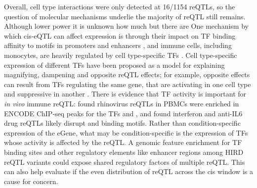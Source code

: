 Overall, cell type interactions were only detected at 16/1154 reQTLs,
so the question of molecular mechanisms underlie the majority of reQTL still remains.
Although lower power  it is unknown how much
but there are 
One mechanism by which cis-eQTL can affect expression is through their impact on \gls{TF} binding affinity to motifs in promoters and enhancers \autocite{pai2015GeneticMechanisticBasis}, 
and immune cells, including monocytes, are heavily regulated by cell type-specific \glspl{TF} \autocite{choudhury2016IdentifyingCellTypeSpecific}.
Cell type-specific expression of different \glspl{TF} have been proposed as a model for explaining magnifying, dampening and opposite reQTL effects;
for example, opposite effects can result from \glspl{TF} regulating the same gene, that are activating in one cell type and suppressive in another \autocite{fu2012UnravelingRegulatoryMechanisms}.
There is evidence that \gls{TF} activity is important for \textit{in vivo} immune reQTL:
\autocite{caliskan2015HostGeneticVariation} found rhinovirus reQTLs in \glspl{PBMC} were enriched in ENCODE ChIP-seq peaks for the \glspl{TF}  and ,
and \autocite{davenport2018DiscoveringVivoCytokineeQTL} found interferon and anti-IL6 drug reQTLs likely disrupt  and  binding motifs.
Rather than condition-specific expression of the eGene, what may be condition-specific is the expression of \glspl{TF} whose activity is affected by the reQTL.
A genomic feature enrichment for TF binding sites and other regulatory elements like enhancer regions among HIRD reQTL variants could expose 
shared regulatory factors of multiple reQTL.
This can also help evaluate if the even distribution of reQTL across the cis window is a cause for concern.

%

